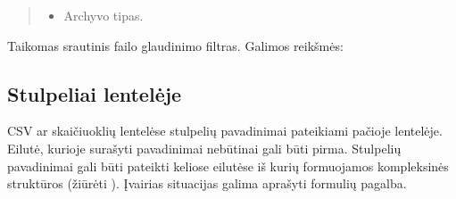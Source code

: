 \documentclass[letterpaper,10pt,lithuanian]{sphinxmanual}
\begin{document}
\begin{fulllineitems}
\begin{fulllineitems}
\begin{quote}
\begin{description}
\begin{itemize}
\item {} 
\sphinxAtStartPar
{} \sphinxhyphen{}\sphinxhyphen{} Archyvo tipas.

\end{itemize}

\end{description}\end{quote}

\sphinxAtStartPar
Taikomas srautinis failo glaudinimo filtras. Galimos  reikšmės:


\begin{fulllineitems}

\pysigstartsignatures
\pysigline
{}
\pysigstopsignatures
\end{fulllineitems}



\begin{fulllineitems}

\pysigstartsignatures
\pysigline
{}
\pysigstopsignatures
\end{fulllineitems}



\begin{fulllineitems}

\pysigstartsignatures
\pysigline
{}
\pysigstopsignatures
\end{fulllineitems}


\end{fulllineitems}


\end{fulllineitems}



\subsection{Stulpeliai lentelėje}
\label{\detokenize{formules:stulpeliai-lenteleje}}\label{\detokenize{formules:id5}}
\sphinxAtStartPar
CSV ar skaičiuoklių lentelėse stulpelių pavadinimai pateikiami pačioje
lentelėje. Eilutė, kurioje surašyti pavadinimai nebūtinai gali būti pirma.
Stulpelių pavadinimai gali būti pateikti keliose eilutėse iš kurių formuojamos
kompleksinės struktūros (žiūrėti {\hyperref[\detokenize{formules:kompleksines-strukturos}]{}}). Įvairias
situacijas galima aprašyti formulių pagalba.
\end{document}
